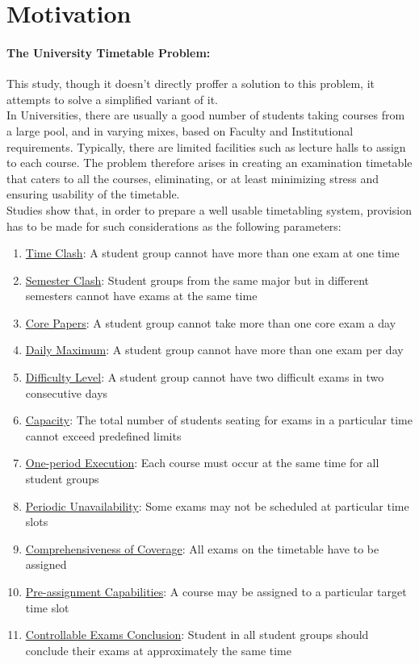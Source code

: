 \documentclass[a4paper,openany]{book}
\begin{document}
		\section{Motivation}
			\paragraph{The University Timetable Problem:}
			This study, though it doesn't directly proffer a solution to this problem, it attempts to solve a simplified variant of it.
			\\In Universities, there are usually a good number of students taking courses from a large pool, and in varying mixes, based on Faculty and Institutional requirements. Typically, there are limited facilities such as lecture halls to assign to each course. The problem therefore arises in creating an examination timetable that caters to all the courses, eliminating, or at least minimizing stress and ensuring usability of the timetable.
			\\Studies show that, in order to prepare a well usable timetabling system, provision has to be made for such considerations as the following parameters:
			\begin{enumerate}
				\item \underline{Time Clash}: A student group cannot have more than one exam at one time
				\item \underline{Semester Clash}: Student groups from the same major but in different semesters cannot have exams at the same time
				\item \underline{Core Papers}: A student group cannot take more than one core exam a day
				\item \underline{Daily Maximum}: A student group cannot have more than one exam per day
				\item \underline{Difficulty Level}: A student group cannot have two difficult exams in two consecutive days
				\item \underline{Capacity}: The total number of students seating for exams in a particular time cannot exceed predefined limits
				\item \underline{One-period Execution}: Each course must occur at the same time for all student groups
				\item \underline{Periodic Unavailability}: Some exams may not be scheduled at particular time slots
				\item \underline{Comprehensiveness of Coverage}: All exams on the timetable have to be assigned
				\item \underline{Pre-assignment Capabilities}: A course may be assigned to a particular target time slot
				\item \underline{Controllable Exams Conclusion}: Student in all student groups should conclude their exams at approximately the same time
			\end{enumerate}
\end{document}
